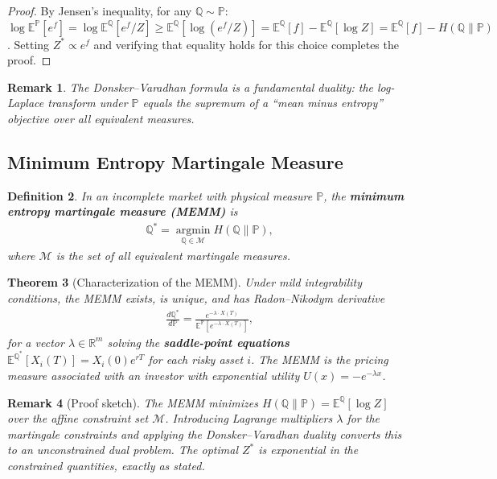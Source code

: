 \documentclass{report}
\theoremstyle{spacedplain}
\newtheorem{theorem}{Theorem}[section]
\theoremstyle{spaceddefinition}
\newtheorem{definition}[theorem]{Definition}
\theoremstyle{spacedremark}
\newtheorem{remark}[theorem]{Remark}
\begin{document}
\begin{proof}
By Jensen's inequality, for any $\mathbb{Q} \sim \mathbb{P}$:
$\log\mathbb{E}^\mathbb{P}[e^f] = \log\mathbb{E}^\mathbb{Q}[e^f/Z] \geq \mathbb{E}^\mathbb{Q}[\log(e^f/Z)] = \mathbb{E}^\mathbb{Q}[f] - \mathbb{E}^\mathbb{Q}[\log Z] = \mathbb{E}^\mathbb{Q}[f] - H(\mathbb{Q}\|\mathbb{P})$. Setting $Z^* \propto e^f$ and verifying that equality holds for this choice completes the proof.
\end{proof}
 
\begin{remark}
The Donsker--Varadhan formula is a fundamental duality: the log-Laplace transform under $\mathbb{P}$ equals the supremum of a ``mean minus entropy'' objective over all equivalent measures.
\end{remark}
 
\subsection{Minimum Entropy Martingale Measure}
 
\begin{definition}
In an incomplete market with physical measure $\mathbb{P}$, the \textbf{minimum entropy martingale measure (MEMM)} is
\begin{align}
    \mathbb{Q}^* = \operatorname*{argmin}_{\mathbb{Q} \in \mathcal{M}}
    H(\mathbb{Q} \| \mathbb{P}),
\end{align}
where $\mathcal{M}$ is the set of all equivalent martingale measures.
\end{definition}
 
\begin{theorem}[Characterization of the MEMM]
Under mild integrability conditions, the MEMM exists, is unique, and has Radon--Nikodym derivative
\begin{align}
    \frac{d\mathbb{Q}^*}{d\mathbb{P}} = \frac{e^{-\lambda \cdot X(T)}}
    {\mathbb{E}^{\mathbb{P}}[e^{-\lambda \cdot X(T)}]},
\end{align}
for a vector $\lambda \in \mathbb{R}^m$ solving the \textbf{saddle-point equations} $\mathbb{E}^{\mathbb{Q}^*}[X_i(T)] = X_i(0)e^{rT}$ for each risky asset $i$. The MEMM is the pricing measure associated with an investor with exponential utility $U(x) = -e^{-\lambda x}$.
\end{theorem}
 
\begin{remark}[Proof sketch]
The MEMM minimizes $H(\mathbb{Q}\|\mathbb{P}) = \mathbb{E}^\mathbb{Q}[\log Z]$ over the affine constraint set $\mathcal{M}$. Introducing Lagrange multipliers
$\lambda$ for the martingale constraints and applying the
Donsker--Varadhan duality converts this to an unconstrained dual problem. The optimal $Z^*$ is exponential in the constrained quantities, exactly as stated.
\end{remark}
 
\end{document}
